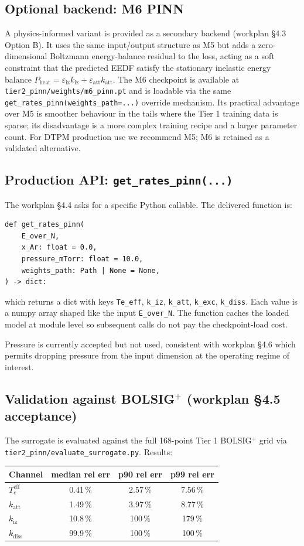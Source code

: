 \documentclass[11pt,a4paper]{article}
\newcommand{\kdiss}{k_{\mathrm{diss}}}
\newcommand{\kiz}{k_{\mathrm{iz}}}
\newcommand{\katt}{k_{\mathrm{att}}}
\begin{document}
\subsection{Optional backend: M6 PINN}
A physics-informed variant is provided as a secondary backend
(workplan §4.3 Option B). It uses the same input/output
structure as M5 but adds a zero-dimensional Boltzmann
energy-balance residual to the loss, acting as a soft constraint
that the predicted EEDF satisfy the stationary inelastic energy
balance $P_{\mathrm{heat}} = \varepsilon_{\mathrm{iz}} \kiz +
\varepsilon_{\mathrm{att}} \katt$. The M6 checkpoint is
available at \texttt{tier2\_pinn/weights/m6\_pinn.pt} and is
loadable via the same
\texttt{get\_rates\_pinn(weights\_path=...)} override
mechanism. Its practical advantage over M5 is smoother
behaviour in the tails where the Tier 1 training data is
sparse; its disadvantage is a more complex training recipe and
a larger parameter count. For DTPM production use we recommend
M5; M6 is retained as a validated alternative.

\subsection{Production API: \texttt{get\_rates\_pinn(...)}}
The workplan §4.4 asks for a specific Python callable. The
delivered function is:
\begin{verbatim}
def get_rates_pinn(
    E_over_N,
    x_Ar: float = 0.0,
    pressure_mTorr: float = 10.0,
    weights_path: Path | None = None,
) -> dict:
\end{verbatim}
which returns a dict with keys \texttt{Te\_eff}, \texttt{k\_iz},
\texttt{k\_att}, \texttt{k\_exc}, \texttt{k\_diss}. Each value
is a numpy array shaped like the input \texttt{E\_over\_N}. The
function caches the loaded model at module level so subsequent
calls do not pay the checkpoint-load cost.

Pressure is currently accepted but not used, consistent with
workplan §4.6 which permits dropping pressure from the input
dimension at the operating regime of interest.

\subsection{Validation against BOLSIG$^+$ (workplan §4.5 acceptance)}
The surrogate is evaluated against the full 168-point Tier 1
BOLSIG$^+$ grid via
\texttt{tier2\_pinn/evaluate\_surrogate.py}. Results:

\begin{center}
\begin{tabular}{lccc}
\toprule
Channel & median rel err & p90 rel err & p99 rel err \\
\midrule
$T_e^{\mathrm{eff}}$ & 0.41\,\% & 2.57\,\% & 7.56\,\% \\
$\katt$              & 1.49\,\% & 3.97\,\% & 8.77\,\% \\
$\kiz$               & 10.8\,\% & 100\,\%  & 179\,\% \\
$\kdiss$             & 99.9\,\% & 100\,\%  & 100\,\% \\
\bottomrule
\end{tabular}
\end{center}
\end{document}
